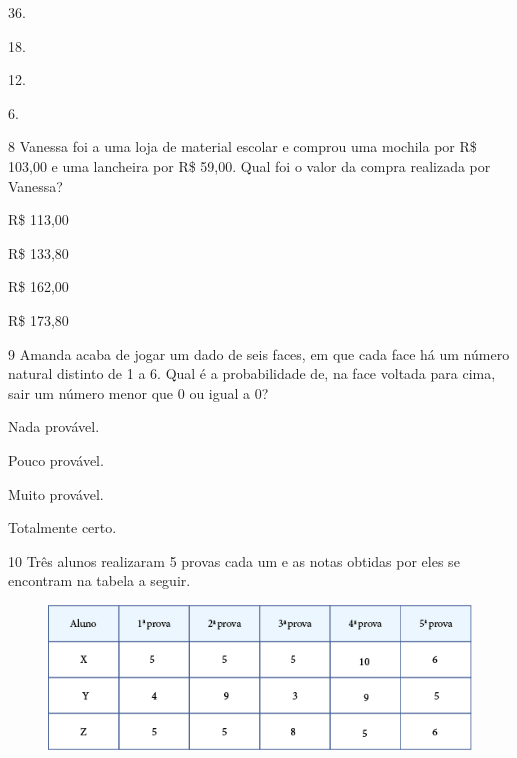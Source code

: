 \begin{multicols}{2}
\begin{escolha}
\item
  36.
\item
  18.
\item
  12.
\item
  6.
\end{escolha}
\end{multicols}


\num{8} Vanessa foi a uma loja de material escolar e comprou uma mochila por R\$ 103,00 e uma lancheira por R\$ 59,00. Qual foi o valor da compra realizada por Vanessa?

\begin{multicols}{2}
\begin{escolha}
\item
  R\$ 113,00
\item
  R\$ 133,80
\item
  R\$ 162,00
\item
  R\$ 173,80
\end{escolha}
\end{multicols}


\num{9} Amanda acaba de jogar um dado de seis faces, em que cada face
há um número natural distinto de 1 a 6. Qual é a probabilidade de, na
face voltada para cima, sair um número menor que 0 ou igual a 0?

\begin{multicols}{2}
\begin{escolha}
\item
  Nada provável.
\item
  Pouco provável.
\item
  Muito provável.
\item
  Totalmente certo.
\end{escolha}
\end{multicols}

\num{10} Três alunos realizaram 5 provas cada um e as notas obtidas por eles se
encontram na tabela a seguir.

\begin{figure}[htpb!]
\centering
\includegraphics[width=\textwidth]{media/image82.png}
\end{figure}

